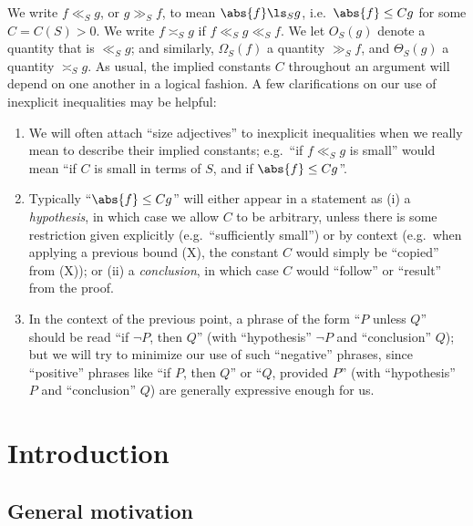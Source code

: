 \documentclass[12pt]{report}
\begin{document}
We write $f\ll_S g$, or $g\gg_S f$, to mean $\abs{f}\ls_S g$,
i.e.~$\abs{f}\leq Cg$ for some $C = C(S)>0$.
We write $f\asymp_S g$ if $f\ll_S g\ll_S f$.
We let $O_S(g)$ denote a quantity that is $\ll_S g$;
and similarly, $\Omega_S(f)$ a quantity $\gg_S f$,
and $\Theta_S(g)$ a quantity $\asymp_S g$.
As usual, the implied constants $C$ throughout an argument will depend on one another in a logical fashion.
A few clarifications on our use of inexplicit inequalities may be helpful:
\begin{enumerate}[(1)]
    \item We will often attach ``size adjectives'' to inexplicit inequalities
    when we really mean to describe their implied constants;
    e.g.~``if $f\ll_{S} g$ is small'' would mean
    ``if $C$ is small in terms of $S$, and if $\abs{f}\leq Cg$''.
    
    \item Typically ``$\abs{f}\leq Cg$'' will either appear in a statement as
    (i) a \emph{hypothesis},
    in which case we allow $C$ to be arbitrary,
    unless there is some restriction given explicitly (e.g.~``sufficiently small'') or by context (e.g.~when applying a previous bound (X), the constant $C$ would simply be ``copied'' from (X));
    or (ii) a \emph{conclusion},
    in which case $C$ would ``follow'' or ``result'' from the proof.
    
    
    \item In the context of the previous point, a phrase of the form ``$P$ unless $Q$'' should be read ``if $\lnot P$, then $Q$'' (with ``hypothesis'' $\lnot P$ and ``conclusion'' $Q$);
    but we will try to minimize our use of such ``negative'' phrases, since ``positive'' phrases like ``if $P$, then $Q$'' or ``$Q$, provided $P$'' (with ``hypothesis'' $P$ and ``conclusion'' $Q$) are generally expressive enough for us.
\end{enumerate}

\chapter{Introduction}
\label{CHAP:intro}

\section{General motivation}
\end{document}

